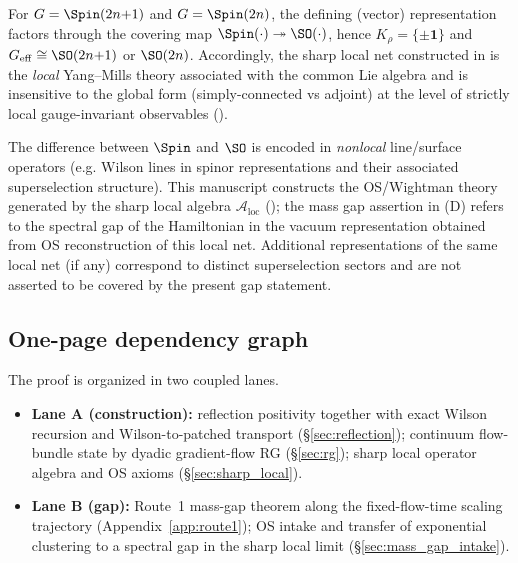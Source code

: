 \begin{remark}
\label{rem:spin_vs_so_meaning}
For $G=\Spin(2n{+}1)$ and $G=\Spin(2n)$, the defining (vector) representation factors through the covering map
$\Spin(\cdot)\twoheadrightarrow \SO(\cdot)$, hence $K_\rho=\{\pm\mathbf 1\}$ and $G_{\mathrm{eff}}\cong\SO(2n{+}1)$ or $\SO(2n)$.
Accordingly, the sharp local net constructed in  is the \emph{local} Yang--Mills theory associated with the common Lie algebra
and is insensitive to the global form (simply-connected vs adjoint) at the level of strictly local gauge-invariant observables ().

The difference between $\Spin$ and $\SO$ is encoded in \emph{nonlocal} line/surface operators (e.g. Wilson lines in spinor representations and
their associated superselection structure).
This manuscript constructs the OS/Wightman theory generated by the sharp local algebra $\mathcal A_{\mathrm{loc}}$ ();
the mass gap assertion in (D) refers to the spectral gap of the Hamiltonian in the vacuum representation obtained from OS reconstruction of this local net.
Additional representations of the same local net (if any) correspond to distinct superselection sectors and are not asserted to be covered by the present gap statement.
\end{remark}

\subsection{One-page dependency graph}
\label{subsec:dependency_graph}

The proof is organized in two coupled lanes.

\begin{itemize}
\item \textbf{Lane A (construction):}
reflection positivity together with exact Wilson recursion and Wilson-to-patched transport (\S\ref{sec:reflection});
continuum flow-bundle state by dyadic gradient-flow RG (\S\ref{sec:rg});
sharp local operator algebra and OS axioms (\S\ref{sec:sharp_local}).

\item \textbf{Lane B (gap):}
Route~1 mass-gap theorem along the fixed-flow-time scaling trajectory (Appendix~\ref{app:route1});
OS intake and transfer of exponential clustering to a spectral gap in the sharp local limit (\S\ref{sec:mass_gap_intake}).
\end{itemize}

